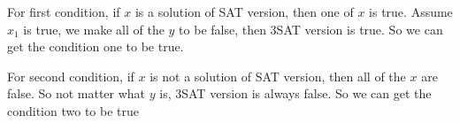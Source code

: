 \documentclass[usletter]{article}
\begin{document}
For first condition, if ${x}$ is a solution of SAT version, then one of ${x}$ is true. Assume $x_1$ is true, we make all of the ${y}$ to be false, then 3SAT version is true. 
So we can get the condition one to be true.

For second condition, if ${x}$ is not a solution of SAT version, then all of the ${x}$ are false. So not matter what ${y}$ is, 3SAT version is always false. So we can get the condition two to be true
\end{document}
